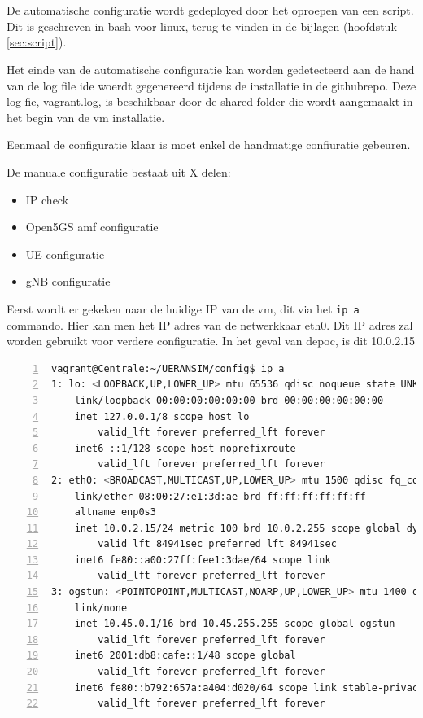 \section{}%
\label{sec:Config}%

De automatische configuratie wordt gedeployed door het oproepen van een script. Dit is geschreven in bash voor linux, terug te vinden in de bijlagen (hoofdstuk \ref{sec:script}).

Het einde van de automatische configuratie kan worden gedetecteerd aan de hand van de log file ide woerdt gegenereerd tijdens de installatie in de githubrepo. Deze log fie, vagrant.log, is beschikbaar door de shared folder die wordt aangemaakt in het begin van de \gls{vm} installatie. 

Eenmaal de configuratie klaar is moet enkel de handmatige confiuratie gebeuren.

De manuale configuratie bestaat uit X delen:

\begin{itemize}
    \item IP check
    \item Open5GS amf configuratie
    \item UE configuratie
    \item gNB configuratie
\end{itemize}

Eerst wordt er gekeken naar de huidige IP van de \gls{vm}, dit via het \verb|ip a| commando. Hier kan men het IP adres van de netwerkkaar eth0. Dit IP adres zal worden gebruikt voor verdere configuratie. In het geval van de\gls{poc}, is dit 10.0.2.15

\begin{lstlisting}[basicstyle=\small, frame=single, breaklines=true, postbreak=\mbox{\textcolor{red}{$\hookrightarrow$}\space}, escapeinside ={\%,}, escapechar={!}, numbers=left, language=sh, caption=IP configuratie]
vagrant@Centrale:~/UERANSIM/config$ ip a
1: lo: <LOOPBACK,UP,LOWER_UP> mtu 65536 qdisc noqueue state UNKNOWN group default qlen 1000
    link/loopback 00:00:00:00:00:00 brd 00:00:00:00:00:00
    inet 127.0.0.1/8 scope host lo
        valid_lft forever preferred_lft forever
    inet6 ::1/128 scope host noprefixroute
        valid_lft forever preferred_lft forever
2: eth0: <BROADCAST,MULTICAST,UP,LOWER_UP> mtu 1500 qdisc fq_codel state UP group default qlen 1000
    link/ether 08:00:27:e1:3d:ae brd ff:ff:ff:ff:ff:ff
    altname enp0s3
    inet 10.0.2.15/24 metric 100 brd 10.0.2.255 scope global dynamic eth0
        valid_lft 84941sec preferred_lft 84941sec
    inet6 fe80::a00:27ff:fee1:3dae/64 scope link
        valid_lft forever preferred_lft forever
3: ogstun: <POINTOPOINT,MULTICAST,NOARP,UP,LOWER_UP> mtu 1400 qdisc fq_codel state UP group default qlen 500
    link/none
    inet 10.45.0.1/16 brd 10.45.255.255 scope global ogstun
        valid_lft forever preferred_lft forever
    inet6 2001:db8:cafe::1/48 scope global
        valid_lft forever preferred_lft forever
    inet6 fe80::b792:657a:a404:d020/64 scope link stable-privacy
        valid_lft forever preferred_lft forever
\end{lstlisting}

